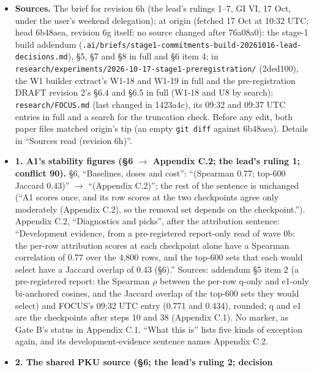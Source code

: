 \documentclass{article}
\theoremstyle{plain}
\theoremstyle{definition}
\theoremstyle{remark}
\begin{document}
\begin{itemize}
  \item \textbf{Sources.} The brief for revision 6h (the lead's rulings 1--7, GI
        VI, 17 Oct, under the user's weekend delegation); at origin (fetched 17
        Oct at 10:32 UTC; head 6b48aea, revision 6g itself; no source changed
        after 76a08a0): the stage-1 build addendum
        (\nolinkurl{.ai/briefs/stage1-commitments-build-20261016-lead-decisions.md}),
        \S{}5, \S{}7 and \S{}8 in full and \S{}6 item 4; in
        \nolinkurl{research/experiments/2026-10-17-stage1-preregistration/}
        (2ded100), the W1 builder extract's W1-18 and W1-19 in full and the
        pre-registration DRAFT revision 2's \S{}6.4 and \S{}6.5 in full (W1-18
        and U8 by search); \nolinkurl{research/FOCUS.md} (last changed in
        1423a4c), its 09:32 and 09:37 UTC entries in full and a search for the
        truncation check. Before any edit, both paper files matched origin's tip
        (an empty \texttt{git diff} against 6b48aea). Details in ``Sources read
        (revision 6h)''.
  \item \textbf{1. A1's stability figures (\S{}6 $\to$ Appendix C.2; the lead's
        ruling 1; conflict 90).} \S{}6, ``Baselines, doses and cost'':
        ``(Spearman 0.77; top-600 Jaccard 0.43)'' $\to$ ``(Appendix C.2)''; the
        rest of the sentence is unchanged (``A1 scores once, and its row scores
        at the two checkpoints agree only moderately (Appendix C.2), so the
        removal set depends on the checkpoint.''). Appendix C.2, ``Diagnostics
        and picks'', after the attribution sentence: ``Development evidence,
        from a pre-registered report-only read of wave 0b: the per-row
        attribution scores at each checkpoint alone have a Spearman correlation
        of 0.77 over the 4,800 rows, and the top-600 sets that each would select
        have a Jaccard overlap of 0.43 (\S{}6).'' Sources: addendum \S{}5 item 2
        (a pre-registered report: the Spearman $\rho$ between the per-row q-only
        and e1-only bi-anchored cosines, and the Jaccard overlap of the top-600
        sets they would select) and FOCUS's 09:32 UTC entry (0.771 and 0.434),
        rounded; q and e1 are the checkpoints after steps 10 and 38 (Appendix
        C.1). No marker, as Gate B's status in Appendix C.1. ``What this is''
        lists five kinds of exception again, and its development-evidence
        sentence names Appendix C.2.
  \item \textbf{2. The shared PKU source (\S{}6; the lead's ruling 2; decision
}
\end{itemize}
\end{document}

